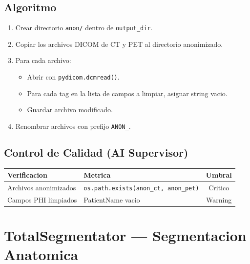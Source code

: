 \documentclass[12pt,a4paper]{article}
\begin{document}
\subsection{Algoritmo}

\begin{enumerate}
    \item Crear directorio \texttt{anon/} dentro de \texttt{output\_dir}.
    \item Copiar los archivos DICOM de CT y PET al directorio anonimizado.
    \item Para cada archivo:
          \begin{itemize}
              \item Abrir con \texttt{pydicom.dcmread()}.
              \item Para cada tag en la lista de campos a limpiar, asignar string vacio.
              \item Guardar archivo modificado.
          \end{itemize}
    \item Renombrar archivos con prefijo \texttt{ANON\_}.
\end{enumerate}

\subsection{Control de Calidad (AI Supervisor)}

\begin{table}[H]
\centering
\begin{tabular}{llc}
\toprule
\textbf{Verificacion} & \textbf{Metrica} & \textbf{Umbral} \\
\midrule
Archivos anonimizados & \texttt{os.path.exists(anon\_ct, anon\_pet)} & Critico \\
Campos PHI limpiados & PatientName vacio & Warning \\
\bottomrule
\end{tabular}
\end{table}

\newpage

\section{TotalSegmentator --- Segmentacion Anatomica}
\label{sec:ts}
\end{document}

